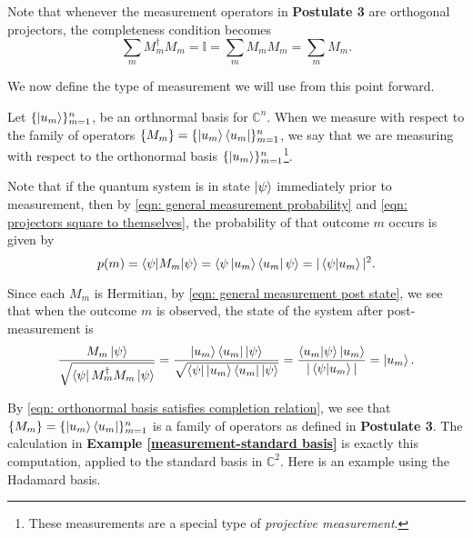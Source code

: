 Note that whenever the measurement operators in \textbf{Postulate 3} are orthogonal projectors, the completeness condition becomes
\begin{equation}
\sum\limits_m M_m^\dagger M_m = \mathbb{I} = \sum\limits_m M_m M_m = \sum\limits_m M_m.
\end{equation}


We now define the type of measurement we will use from this point forward.  

\begin{definition} \label{def: measurement in a basis state vector}
Let $\{\ket{u_m}\}_{m=1}^n$, be an orthnormal basis for $\mathbb{C}^n$.  When we measure with respect to the family of operators $\{M_m\}=\{\ket{u_m}\bra{u_m}\}_{m=1}^n$, we say that we are measuring with respect to the orthonormal basis $\{\ket{u_m}\}_{m=1}^n$\footnote{These measurements are a special type of \textit{projective measurement}.}.
\end{definition}
Note that if the quantum system is in state $\ket{\psi}$ immediately prior to measurement, then by \eqref{eqn: general measurement probability} and \eqref{eqn: projectors square to themselves}, the probability of that outcome $m$ occurs is given by
\begin{equation}\label{eqn: basis measurement probability}
    p(m)=\braket{\psi|M_m|\psi}=\braket{\psi\ket{u_m}\bra{u_m}\psi}=|\braket{\psi|u_m}|^2.
\end{equation}

Since each $M_m$ is Hermitian, by \eqref{eqn: general measurement post state}, we see that when the outcome $m$ is observed, the state of the system after post-measurement is
\begin{equation} 
\frac{M_m \ket{\psi}}{\sqrt{\bra{\psi}M_m^\dagger M_m \ket{\psi}}}=\frac{\ket{u_m}\bra{u_m} \ket{\psi}}{\sqrt{\bra{\psi}\ket{u_m}\bra{u_m} \ket{\psi}}}=\frac{\braket{u_m|\psi}\ket{u_m}}{|\braket{\psi|u_m}|}=\ket{u_m}.
\end{equation}

By \eqref{eqn: orthonormal basis satisfies completion relation}, we see that $\{M_m\}=\{\ket{u_m}\bra{u_m}\}_{m=1}^n$ is a family of operators as defined in \textbf{Postulate 3}.  The calculation in \textbf{Example \ref{measurement-standard basis}} is exactly this computation, applied to the standard basis in  $\mathbb{C}^2$.  Here is an example using the Hadamard basis.

